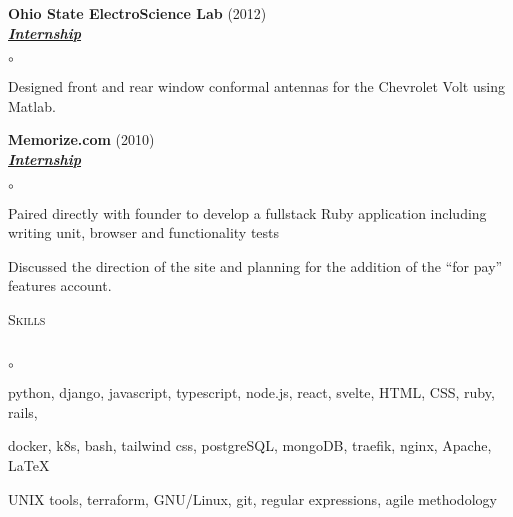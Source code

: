 \documentclass{article}
\newcommand{\lineunder}{\vspace*{-8pt} \\ \hspace*{-18pt} \hrulefill{} \\}
\newcommand{\header}[1]{{\hspace*{-15pt}\vspace*{6pt} \textsc{#1}} \vspace*{-6pt} \lineunder}
\newcommand{\employer}[3]{{ \textbf{#1} (#2)\\ \underline{\textbf{\emph{#3}}}\\  }}
\newenvironment{achievements}{\begin{list}{$\circ$}{\topsep 0pt \itemsep -2pt}}{\vspace*{4pt}\end{list}}
\begin{document}
\newpage

\employer{Ohio State ElectroScience Lab}{2012}{Internship}
	\begin{achievements}
	\item Designed front and rear window conformal antennas for the Chevrolet Volt using Matlab.
	\end{achievements}

\employer{Memorize.com}{2010}{Internship}
	\begin{achievements}
	\item Paired directly with founder to develop a fullstack Ruby application including writing
	      unit, browser and functionality tests
	\item Discussed the direction of the site and planning
          for the addition of the ``for pay'' features
	account.
	\end{achievements}

\header{Skills}
\begin{achievements}
	\item python, django, javascript, typescript, node.js, react, svelte, HTML, CSS, ruby, rails,
	\item docker, k8s, bash, tailwind css, postgreSQL, mongoDB, traefik, nginx, Apache, \LaTeX{}
	\item UNIX tools, terraform, GNU/Linux, git, regular expressions, agile methodology
\end{achievements}
\end{document}
